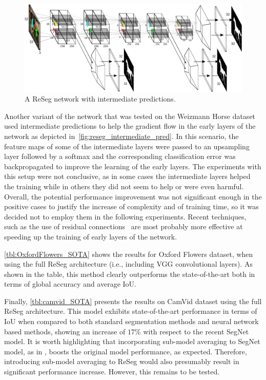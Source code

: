 \begin{figure}[t]
    \centering
    \includegraphics[width=\textwidth]{img/reseg/reseg_interm_pred.pdf}
    \caption{A ReSeg network with intermediate predictions.}
    \label{fig:reseg_intermediate_pred}
\end{figure}

Another variant of the network that was tested on the Weizmann Horse dataset
used intermediate predictions to help the gradient flow in the early layers
of the network as depicted in~\autoref{fig:reseg_intermediate_pred}. In this
scenario, the feature maps of some of the intermediate layers were passed to an
upsampling layer followed by a softmax and the corresponding classification
error was backpropagated to improve the learning of the early layers. The
experiments with this setup were not conclusive, as in some cases the
intermediate layers helped the training while in others they did not seem to
help or were even harmful. Overall, the potential performance improvement was
not significant enough in the positive cases to justify the increase of
complexity and of training time, so it was decided not to employ them in the
following experiments. Recent techniques, such as the use of residual
connections~\citep{he2015deep,srivastava2015training} are most probably more
effective at speeding up the training of early layers of the network.

\autoref{tbl:OxfordFlowers_SOTA} shows the results for Oxford Flowers dataset,
when using the full ReSeg architecture (i.e., including VGG convolutional
layers).  As shown in the table, this method clearly outperforms the
state-of-the-art both in terms of global accuracy and average IoU.

Finally, \autoref{tbl:camvid_SOTA} presents the results on CamVid dataset using
the full ReSeg architecture. This model exhibits state-of-the-art performance
in terms of IoU when compared to both standard segmentation methods and neural
network based methods, showing an increase of $17\%$ with respect to the recent
SegNet model. It is worth highlighting that incorporating sub-model averaging
to SegNet model, as in \cite{Kendall2015bayesiansegnet}, boosts the original
model performance, as expected. Therefore, introducing sub-model averaging to
ReSeg would also presumably result in significant performance increase.
However, this remains to be tested.

